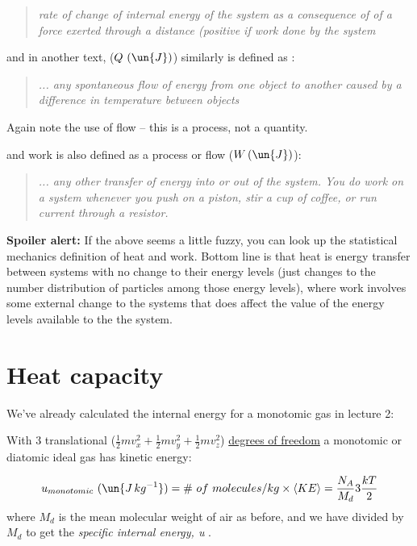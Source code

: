 \documentclass[12pt]{article}
\begin{document}
\begin{quote}
  \textit{rate of change of internal energy of the system as a consequence of
of a force exerted through a distance (positive if work done by the system}
\end{quote}

\noindent
and in another text, ($Q\ (\un{J})$) similarly is defined as :

\begin{quote}
  \textit{... any spontaneous flow of energy from one object to another caused by a difference
  in temperature between objects}
\end{quote}
Again note the use of flow -- this is a process, not a quantity.

\noindent
and work is also defined as a process or flow ($W\, (\un{J})$):

\begin{quote}
  
  \textit{... any other transfer of energy into or out of the system.
    You do work on a system whenever you push on a piston, stir a cup
    of coffee, or run current through a resistor.}

\end{quote}

\textbf{Spoiler alert:} If the above seems a little fuzzy, you can
look up  the statistical mechanics
definition of heat and work.  Bottom line is
that heat is energy transfer between systems with no change to their
energy levels (just changes to the number distribution of particles
among those energy levels), where work involves some external change
to the systems that does affect the value of the energy levels
available to the the system.


\section{Heat capacity}
\label{sec:heat-capacity}


We've already calculated the internal energy for a monotomic gas in lecture 2:

With 3 translational ($\frac{1}{2}mv_x^2 + \frac{1}{2}mv_y^2 + \frac{1}{2}mv_z^2$)   
\href{http://en.wikipedia.org/wiki/Degrees_of_freedom_%28physics_and_chemistry%29}%
{degrees of freedom} a  monotomic or diatomic ideal gas has kinetic energy:

\begin{equation}
  \label{eq:Umono}
  u_{monotomic}\ (\un{J\,kg^{-1}})= \#\ of\ molecules/kg \times \left < KE \right >
  = \frac{N_A}{M_d} 3 \frac{k T }{2 } 
\end{equation}
where $M_d$ is the mean molecular weight of air as before, and we have
divided by $M_d$ to get the \textit{specific internal energy, u
  }.  
\end{document}
